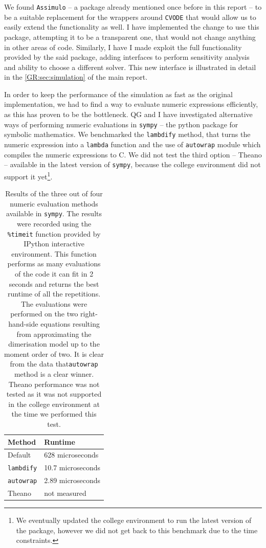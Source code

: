 We found \verb"Assimulo" -- a package already mentioned once before in this report -- to be a suitable replacement for the wrappers around \verb"CVODE" that would allow us to easily extend the functionality as well. 
I have implemented the change to use this package, attempting it to be a transparent one, that would not change anything in other areas of code. Similarly, I have I made \means{} exploit the full functionality provided by the said package, adding interfaces to perform sensitivity analysis and ability to choose a different solver. 
This new interface is illustrated in detail in the \autoref*{GR:sec:simulation} of the main report.

In order to keep the performance of the simulation as fast as the original implementation, we had to find a way to evaluate numeric expressions efficiently, as this has proven to be the bottleneck. 
QG and I have investigated alternative ways of performing numeric evaluations in \verb"sympy" -- the python package for symbolic mathematics. We benchmarked the \verb"lambdify" method, that turns the numeric expression into a \verb"lambda" function and the use of  \verb"autowrap" module which compiles the numeric expressions to C.
We did not test the third option -- Theano\cite{bergstra_theano:_2010} -- available in the latest version of \verb"sympy", because the college environment did not support it yet\footnote{We eventually updated the college environment to run the latest version of the package, however we did not get back to this benchmark due to the time constraints.}.

\begin{table}
    \centering
    \begin{tabular}{l|l}
    Method & Runtime \\
    \hline
    Default & 628 microseconds \\
    \verb"lambdify" & 10.7 microseconds \\
    \verb"autowrap" & 2.89 microseconds \\
    Theano & not measured \\
    \end{tabular}
    \caption{Results of the three out of four numeric evaluation methods available in {\tt sympy}. 
    The results were recorded using the {\tt \%timeit} 
    function provided by IPython\cite{perez_ipython:_2007} interactive environment. 
    This function performs as many evaluations of the code it can fit in 2 seconds and returns the best runtime of all the repetitions.
    The evaluations were performed on the two right-hand-side equations resulting from approximating the dimerisation model up to the moment order of two.
    It is clear from the data that{\tt autowrap} method is a clear winner. 
    Theano performance was not tested as it was not supported in the college environment at the time we performed this test.}
    \label{tab:numeric-runtimes}
\end{table}

